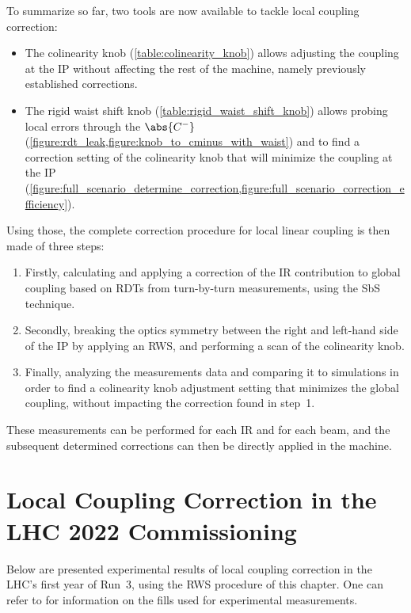 To summarize so far, two tools are now available to tackle local coupling correction:
\begin{itemize}
    \item The colinearity knob (\cref{table:colinearity_knob}) allows adjusting the coupling at the IP without affecting the rest of the machine, namely previously established corrections.
    \item The rigid waist shift knob (\cref{table:rigid_waist_shift_knob}) allows probing local errors through the \(\abs{C^{-}}\) (\cref{figure:rdt_leak,figure:knob_to_cminus_with_waist}) and to find a correction setting of the colinearity knob that will minimize the coupling at the IP (\cref{figure:full_scenario_determine_correction,figure:full_scenario_correction_efficiency}).
\end{itemize}

Using those, the complete correction procedure for local linear coupling is then made of three steps:
\begin{enumerate}
    \item Firstly, calculating and applying a correction of the IR contribution to global coupling based on RDTs from turn-by-turn measurements, using the SbS technique.
    \item Secondly, breaking the optics symmetry between the right and left-hand side of the IP by applying an RWS, and performing a scan of the colinearity knob.
    \item Finally, analyzing the measurements data and comparing it to simulations in order to find a colinearity knob adjustment setting that minimizes the global coupling, without impacting the correction found in step~\num{1}.
\end{enumerate}

These measurements can be performed for each IR and for each beam, and the subsequent determined corrections can then be directly applied in the machine.


\section{Local Coupling Correction in the LHC 2022 Commissioning}
\label{section:rws_experimental_results}

Below are presented experimental results of local coupling correction in the LHC's first year of Run~\num{3}, using the RWS procedure of this chapter.
One can refer to  for information on the fills used for experimental measurements.

